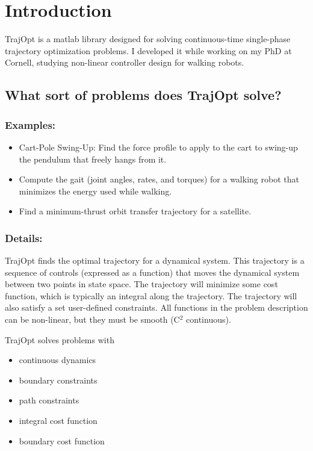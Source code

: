 \section{Introduction}

TrajOpt is a matlab library designed for solving continuous-time single-phase trajectory optimization problems. I developed it while working on my PhD at Cornell, studying non-linear controller design for walking robots.

\subsection{What sort of problems does TrajOpt solve?}

\subsubsection*{Examples:}
\begin{itemize} 
\item Cart-Pole Swing-Up: Find the force profile to apply to the cart to swing-up the pendulum that freely hangs from it.
\item Compute the gait (joint angles, rates, and torques) for a walking robot that minimizes the energy used while walking.
\item Find a minimum-thrust orbit transfer trajectory for a satellite.
\end{itemize}

\subsubsection*{Details:}

TrajOpt finds the optimal trajectory for a dynamical system. This trajectory is a sequence of controls (expressed as a function) that moves the dynamical system between two points in state space. The trajectory will minimize some cost function, which is typically an integral along the trajectory. The trajectory will also satisfy a set user-defined constraints. All functions in the problem description can be non-linear, but they must be smooth (C$^2$ continuous).

TrajOpt solves problems with
\begin{itemize} \setlength\itemsep{-0.1em}
\item continuous dynamics
\item boundary constraints
\item path constraints
\item integral cost function
\item boundary cost function
\end{itemize}


